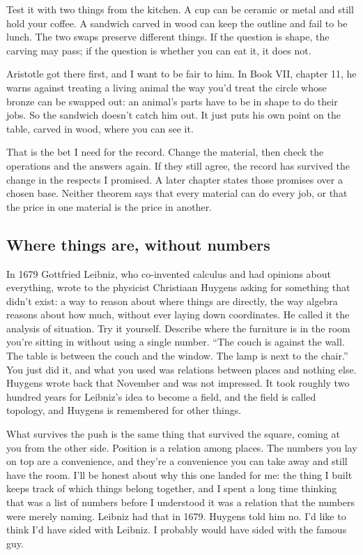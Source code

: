 \documentclass[11pt,twoside]{article}
\theoremstyle{thielethm}
\theoremstyle{thieledef}
\theoremstyle{thieledef}
\theoremstyle{thieledef}
\theoremstyle{thielethm}
\theoremstyle{thieleobs}
\theoremstyle{thielethm}
\begin{document}
Test it with two things from the kitchen. A cup can be ceramic or metal and still hold your coffee. A sandwich carved in wood can keep the outline and fail to be lunch. The two swaps preserve different things. If the question is shape, the carving may pass; if the question is whether you can eat it, it does not.

Aristotle got there first, and I want to be fair to him. In Book VII, chapter 11, he warns against treating a living animal the way you'd treat the circle whose bronze can be swapped out: an animal's parts have to be in shape to do their jobs. So the sandwich doesn't catch him out. It just puts his own point on the table, carved in wood, where you can see it.

That is the bet I need for the record. Change the material, then check the operations and the answers again. If they still agree, the record has survived the change in the respects I promised. A later chapter states those promises over a chosen base. Neither theorem says that every material can do every job, or that the price in one material is the price in another.

\subsection{Where things are, without numbers}

In 1679 Gottfried Leibniz, who co-invented calculus and had opinions about everything, wrote to the physicist Christiaan Huygens asking for something that didn't exist: a way to reason about where things are directly, the way algebra reasons about how much, without ever laying down coordinates. He called it the analysis of situation. Try it yourself. Describe where the furniture is in the room you're sitting in without using a single number. ``The couch is against the wall. The table is between the couch and the window. The lamp is next to the chair.'' You just did it, and what you used was relations between places and nothing else. Huygens wrote back that November and was not impressed. It took roughly two hundred years for Leibniz's idea to become a field, and the field is called topology, and Huygens is remembered for other things.

What survives the push is the same thing that survived the square, coming at you from the other side. Position is a relation among places. The numbers you lay on top are a convenience, and they're a convenience you can take away and still have the room. I'll be honest about why this one landed for me: the thing I built keeps track of which things belong together, and I spent a long time thinking that was a list of numbers before I understood it was a relation that the numbers were merely naming. Leibniz had that in 1679. Huygens told him no. I'd like to think I'd have sided with Leibniz. I probably would have sided with the famous guy.
\end{document}
